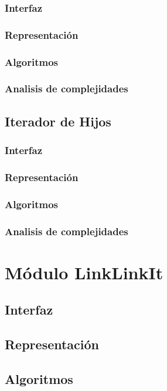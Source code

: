 \documentclass[12pt, a4paper]{article}
\begin{document}
\subsubsection{Interfaz}

\subsubsection{Representaci\'on}

\subsubsection{Algoritmos}

\subsubsection{Analisis de complejidades}

 
\subsection{Iterador de Hijos} 
\subsubsection{Interfaz}

\subsubsection{Representaci\'on}

\subsubsection{Algoritmos}

\subsubsection{Analisis de complejidades}

\newpage 
\section{M\'odulo LinkLinkIt} 
\subsection{Interfaz}

\subsection{Representaci\'on}

\subsection{Algoritmos}

\end{document}
